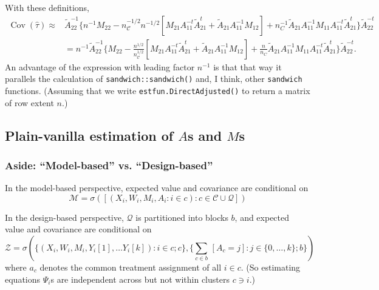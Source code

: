 \documentclass{article}
\begin{document}
With these definitions,
\begin{align}
  \operatorname{Cov}(\hat\tau) \approx& \tilde{A}_{22}^{-1}\{n^{-1} M_{22} -
                                 n_{\mathcal{C}}^{-1/2}n^{-1/2}[M_{21}A_{11}^{-t}\tilde{A}_{21}^t
                                 + \tilde{A}_{21}A_{11}^{-1}M_{12}] +
                                 n_C^{-1}\tilde{A}_{21}A_{11}^{-1}M_{11}A_{11}^{-t}\tilde{A}_{21}^{t}\}\tilde{A}_{22}^{-t}\nonumber
  \\
                               &= n^{-1}\tilde{A}_{22}^{-1}\{
                                 M_{22} -
                                 \frac{n^{1/2}}{n_{\mathcal{C}}^{1/2}}[M_{21}A_{11}^{-t}\tilde{A}_{21}^t
                                 + \tilde{A}_{21}A_{11}^{-1}M_{12}] +
                                 \frac{n}{n_C}\tilde{A}_{21}A_{11}^{-1}M_{11}A_{11}^{-t}\tilde{A}_{21}^{t}\}\tilde{A}_{22}^{-t}
                                . \label{eq:6}
\end{align}
An advantage of the expression with leading factor $n^{-1}$ is that
that way it parallels the calculation of
\texttt{sandwich::sandwich()} and, I think, other \texttt{sandwich}
functions. (Assuming that we write
\texttt{estfun.DirectAdjusted()}  to return a matrix of row extent
$n$.)

  \subsection{Plain-vanilla estimation of $A$s and $M$s}
\subsubsection {Aside: ``Model-based'' vs. ``Design-based''}\label{sec:des-vs-mod-based}

In the model-based perspective, expected value and covariance are
conditional on
\[ \mathcal{M} = \sigma\left(\left[(X_{i}, W_{i}, M_{i}, A_{i}: i \in c): c \in
      \mathcal{C}\cup \mathcal{Q} \right]\right)\]


In the design-based perspective, $\mathcal{Q}$ is partitioned into
blocks $b$, and expected value and covariance are
conditional on
\[\mathcal{Z} = \sigma(\{(X_{i}, W_{i}, M_{i}, Y_{i}[1], \ldots Y_{i}[k]):
  i \in c; c\}, \{\sum_{c
    \in b}\, \![A_{c}=j\!] : j \in \{0, \ldots, k\}; b\} )\]
where $a_{c}$ denotes the common treatment assignment of all $i\in
c$. (So estimating equations ${\Psi}_{i}$s are independent across but not within
clusters $c \ni i$.)
\end{document}
